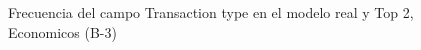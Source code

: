 \begin{figure}[H]
    \centering
    
    \caption{Frecuencia del campo Transaction type en el modelo real y Top 2, Economicos (B-3)}
    \label{frecuency-Transaction Type-top2}
\end{figure}